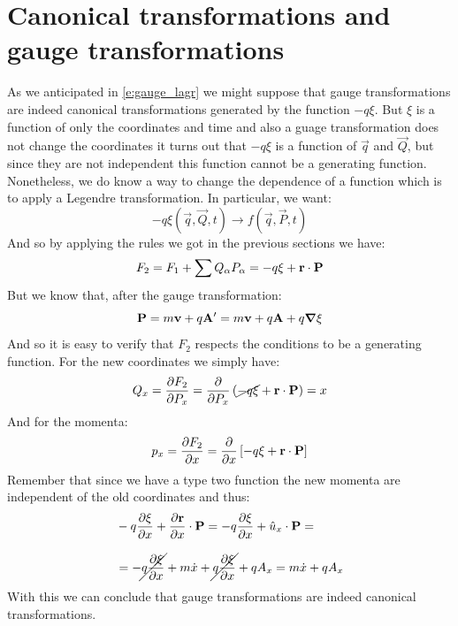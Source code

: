 \section{Canonical transformations and gauge transformations}
As we anticipated in \eqref{e:gauge_lagr} we might suppose that gauge transformations are indeed canonical transformations generated by the function $-q\xi$. But $\xi$ is a function of only the coordinates and time and also a guage transformation does not change the coordinates it turns out that $-q\xi$ is a function of $\vec{q}$ and $\vec{Q}$, but since they are not independent this function cannot be a generating function. Nonetheless, we do know a way to change the dependence of a function which is to apply a Legendre transformation. In particular, we want:
\begin{equation}
  -q\xi (\vec{q},\vec{Q},t) \longrightarrow f (\vec{q},\vec{P},t)
\end{equation}
And so by applying the rules we got in the previous sections we have:
\begin{equation}
  F_2 = F_1 + \displaystyle\sum Q_{\alpha}P_{\alpha} = -q\xi + \vb{r}\cdot \vb{P}
\end{equation}
But we know that, after the gauge transformation:
\begin{equation}
  \vb{P} = m\vb{v} + q\vb{A}' = m\vb{v} + q\vb{A} + q\grad{\xi}
\end{equation}
And so it is easy to verify that $F_2$ respects the conditions to be a generating function. For the new coordinates we simply have:
\begin{equation}
  Q_{x} = \pdv{F_2}{P_x} = \pdv{}{P_x}\brackets{\cancel{-q\xi} + \vec{r}\cdot \vec{P}} = x
\end{equation}
And for the momenta:
\begin{equation}
  p_x = \pdv{F_2}{x} = \pdv{}{x}\left[-q\xi + \vec{r}\cdot \vec{P}\right]
\end{equation}
Remember that since we have a type two function the new momenta are independent of the old coordinates and thus:
\begin{equation}
  \begin{split}
    &-q\pdv{\xi}{x} + \pdv{\vec{r}}{x} \cdot \vec{P} = -q\pdv{\xi}{x} + \hat{u}_x \cdot \vec{P} = \\[8pt]
    &= -\cancel{q\pdv{\xi}{x}} + m\dot{x} + \cancel{q\pdv{\xi}{x}} + qA_x = m\dot{x} + qA_x
  \end{split}
\end{equation}
With this we can conclude that gauge transformations are indeed canonical transformations.

